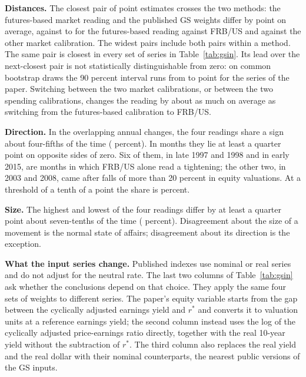 \textbf{Distances.} The closest pair of point estimates crosses the two methods: the futures-based market reading and the published GS weights differ by  point on average, against  to  for the futures-based reading against FRB/US and against the other market calibration. The widest pairs include both pairs within a method. The same pair is closest in every set of series in Table~\ref{tab:gsin}. Its lead over the next-closest pair is not statistically distinguishable from zero: on common bootstrap draws the 90 percent interval runs from  to  point for the series of the paper. Switching between the two market calibrations, or between the two spending calibrations, changes the reading by about as much on average as switching from the futures-based calibration to FRB/US.

\textbf{Direction.} In the  overlapping annual changes, the four readings share a sign about four-fifths of the time ( percent). In  months they lie at least a quarter point on opposite sides of zero. Six of them, in late 1997 and 1998 and in early 2015, are months in which FRB/US alone read a tightening; the other two, in 2003 and 2008, came after falls of more than 20 percent in equity valuations. At a threshold of a tenth of a point the share is  percent.

\textbf{Size.} The highest and lowest of the four readings differ by at least a quarter point about seven-tenths of the time ( percent). Disagreement about the size of a movement is the normal state of affairs; disagreement about its direction is the exception.

\textbf{What the input series change.} Published indexes use nominal or real series and do not adjust for the neutral rate. The last two columns of Table~\ref{tab:gsin} ask whether the conclusions depend on that choice. They apply the same four sets of weights to different series. The paper's equity variable starts from the gap between the cyclically adjusted earnings yield and $r^*$ and converts it to valuation units at a reference earnings yield; the second column instead uses the log of the cyclically adjusted price-earnings ratio directly, together with the real 10-year yield without the subtraction of $r^*$. The third column also replaces the real yield and the real dollar with their nominal counterparts, the nearest public versions of the GS inputs.

